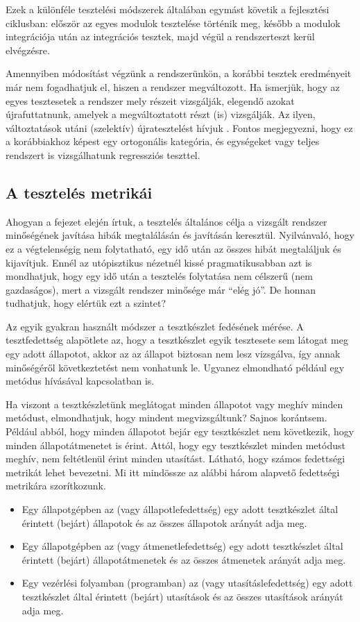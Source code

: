 Ezek a különféle tesztelési módszerek általában egymást követik a fejlesztési ciklusban: először az egyes modulok tesztelése történik meg, később a modulok integrációja után az integrációs tesztek, majd végül a rendszerteszt kerül elvégzésre.

Amennyiben módosítást végzünk a rendszerünkön, a korábbi tesztek eredményeit már nem fogadhatjuk el, hiszen a rendszer megváltozott. Ha ismerjük, hogy az egyes tesztesetek a rendszer mely részeit vizsgálják, elegendő azokat újrafuttatnunk, amelyek a megváltoztatott részt (is) vizsgálják. Az ilyen, változtatások utáni (szelektív) újratesztelést hívjuk . Fontos megjegyezni, hogy ez a korábbiakhoz képest egy ortogonális kategória, és egységeket vagy teljes rendszert is vizsgálhatunk regressziós teszttel. 

\subsection{A tesztelés metrikái}
Ahogyan a fejezet elején írtuk, a tesztelés általános célja a vizsgált rendszer minőségének javítása hibák megtalálásán és javításán keresztül. Nyilvánvaló, hogy ez a végtelenségig nem folytatható, egy idő után az összes hibát megtaláljuk és kijavítjuk. Ennél az utópisztikus nézetnél kissé pragmatikusabban azt is mondhatjuk, hogy egy idő után a tesztelés folytatása nem célszerű (nem gazdaságos), mert a vizsgált rendszer minősége már ``elég jó''. %
De honnan tudhatjuk, hogy elértük ezt a szintet?

Az egyik gyakran használt módszer a tesztkészlet fedésének mérése. A tesztfedettség alapötlete az, hogy a tesztkészlet egyik tesztesete sem látogat meg egy adott állapotot, akkor az az állapot biztosan nem lesz vizsgálva, így annak minőségéről következtetést nem vonhatunk le. Ugyanez elmondható például egy metódus hívásával kapcsolatban is.

Ha viszont a tesztkészletünk meglátogat minden állapotot vagy meghív minden metódust, elmondhatjuk, hogy mindent megvizsgáltunk? Sajnos korántsem. Például abból, hogy minden állapotot bejár egy tesztkészlet nem következik, hogy minden állapotátmenetet is érint. Attól, hogy egy tesztkészlet minden metódust meghív, nem feltétlenül érint minden utasítást. Látható, hogy számos fedettségi metrikát lehet bevezetni. Mi itt mindössze az alábbi három alapvető fedettségi metrikára szorítkozunk.
\begin{itemize}
	\item Egy állapotgépben az  (vagy állapotlefedettség) egy adott tesztkészlet által érintett (bejárt) állapotok és az összes állapotok arányát adja meg.
	\item Egy állapotgépben az  (vagy átmenetlefedettség) egy adott tesztkészlet által érintett (bejárt) állapotátmenetek és az összes átmenetek arányát adja meg.
	\item Egy vezérlési folyamban (programban) az  (vagy utasításlefedettség) egy adott tesztkészlet által érintett (bejárt) utasítások és az összes utasítások arányát adja meg.	
\end{itemize}

